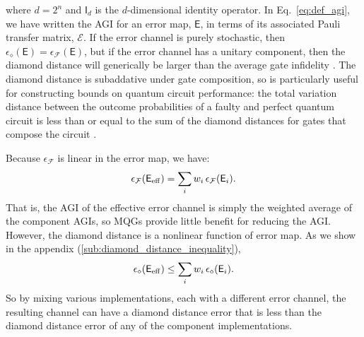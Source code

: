\documentclass[aps,nofootinbib,pra,notitlepage,twocolumn]{revtex4-1}
\newcommand{\error}{\ensuremath{{\mathsf{E}}}}
\newcommand{\errmat}{\ensuremath{{\mathcal{E}}}}
\newcommand{\AGI}{\ensuremath{\epsilon_\mathcal{F}}}
\newcommand{\dnorm}{\ensuremath{\epsilon_\diamond}}
\newcommand{\ident}{\ensuremath{\mathsf{I}}}
\newcommand{\0}{\ensuremath{\mathbf{0}}}
\newcommand{\weight}{\ensuremath{w}}
\begin{document}
where $d=2^n$ and $\ident_d$ is the $d$-dimensional identity operator.  In Eq.~\eqref{eq:def_agi}, we have written the AGI for an error map, $\error$, in terms of its associated Pauli transfer matrix, $\errmat$. If the error channel is purely stochastic, then $\dnorm(\error) = \AGI(\error)$, but if the error channel has a unitary component, then the diamond distance will generically be larger than the average gate infidelity \cite{1511.00727}. The diamond distance is subaddative \cite{watrous2018theory} under gate composition, so is particularly useful for constructing bounds on quantum circuit performance: the total variation distance between the outcome probabilities of a faulty and perfect quantum circuit is less than or equal to the sum of the diamond distances for gates that compose the circuit \cite{aharonov1998quantum}.

Because $\AGI$ is linear in the error map, we have:
\begin{equation}
	\AGI\!\left(\error_{\rm eff}\right) = \sum_i \weight_i \,\AGI(\error_i).
\end{equation}
That is, the AGI of the effective error channel is simply the weighted average of the component AGIs, so MQGs provide little benefit for reducing the AGI. However, the diamond distance is a nonlinear function of error map. As we show in the appendix (\ref{sub:diamond_distance_inequality}),
\begin{equation}
	\label{eq:diamond_ineq}
	\dnorm\!\left(\error_{\rm eff}\right) \le \sum_i \weight_i \, \dnorm(\error_i).
\end{equation}
So by mixing various implementations, each with a different error channel, the resulting channel can have a diamond distance error that is less than the diamond distance error of any of the component implementations. 
\end{document}
